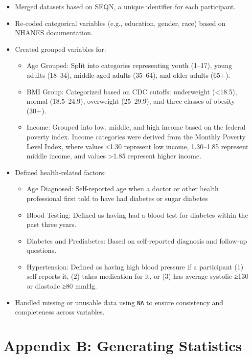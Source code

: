 \documentclass[
]{article}
\providecommand{\tightlist}{%
  \setlength{\itemsep}{0pt}\setlength{\parskip}{0pt}}
\begin{document}
\begin{itemize}
\tightlist
\item
  Merged datasets based on SEQN, a unique identifier for each
  participant.
\item
  Re-coded categorical variables (e.g., education, gender, race) based
  on NHANES documentation.
\item
  Created grouped variables for:

  \begin{itemize}
  \tightlist
  \item
    Age Grouped: Split into categories representing youth (1--17), young
    adults (18--34), middle-aged adults (35--64), and older adults
    (65+).
  \item
    BMI Group: Categorized based on CDC cutoffs: underweight
    (\textless18.5), normal (18.5--24.9), overweight (25--29.9), and
    three classes of obesity (30+).
  \item
    Income: Grouped into low, middle, and high income based on the
    federal poverty index. Income categories were derived from the
    Monthly Poverty Level Index, where values ≤1.30 represent low
    income, 1.30--1.85 represent middle income, and values
    \textgreater1.85 represent higher income.
  \end{itemize}
\item
  Defined health-related factors:

  \begin{itemize}
  \tightlist
  \item
    Age Diagnosed: Self-reported age when a doctor or other health
    professional first told to have had diabetes or sugar diabetes
  \item
    Blood Testing: Defined as having had a blood test for diabetes
    within the past three years.
  \item
    Diabetes and Prediabetes: Based on self-reported diagnosis and
    follow-up questions.
  \item
    Hypertension: Defined as having high blood pressure if a participant
    (1) self-reports it, (2) takes medication for it, or (3) has average
    systolic ≥130 or diastolic ≥80 mmHg.
  \end{itemize}
\item
  Handled missing or unusable data using \texttt{NA} to ensure
  consistency and completeness across variables.
\end{itemize}

\section{Appendix B: Generating
Statistics}\label{appendix-b-generating-statistics}
\end{document}
